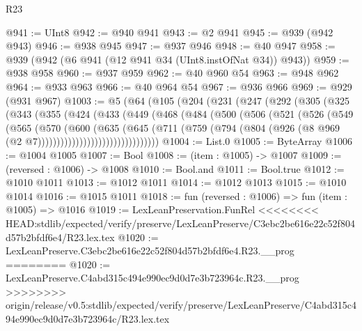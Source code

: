 \begin{lexlean}{R23}
\begin{coremodule}
{{{{{{{{{{{{{{{{{{{{{{{{{{{{{{{{{{{{{{{{{{{{{{{@941 := UInt8
@942 := @940 @941
@943 := @2 @941
@945 := @939 (@942 @943)
@946 := @938 @945
@947 := @937 @946
@948 := @40 @947
@958 := @939 (@942 (@6 @941 (@12 @941 @34 (UInt8.instOfNat @34)) @943))
@959 := @938 @958
@960 := @937 @959
@962 := @40 @960 @54
@963 := @948 @962
@964 := @933 @963
@966 := @40 @964 @54
@967 := @936 @966
@969 := @929 (@931 @967)
@1003 := @5
    (@64
      (@105
        (@204
          (@231
            (@247
              (@292
                (@305
                  (@325
                    (@343
                      (@355
                        (@424
                          (@433
                            (@449
                              (@468
                                (@484
                                  (@500
                                    (@506
                                      (@521
                                        (@526
                                          (@549
                                            (@565
                                              (@570
                                                (@600
                                                  (@635
                                                    (@645
                                                      (@711
                                                        (@759
                                                          (@794
                                                            (@804
                                                              (@926
                                                                (@8
                                                                  @969
                                                                  (@2
                                                                    @7))))))))))))))))))))))))))))))))
@1004 := List.{0}
@1005 := ByteArray
@1006 := @1004 @1005
@1007 := Bool
@1008 := (item : @1005) -> @1007
@1009 := (reversed : @1006) -> @1008
@1010 := Bool.and
@1011 := Bool.true
@1012 := @1010 @1011
@1013 := @1012 @1011
@1014 := @1012 @1013
@1015 := @1010 @1014
@1016 := @1015 @1011
@1018 := fun (reversed : @1006) => fun (item : @1005) => @1016
@1019 := LexLeanPreservation.FunRel
<<<<<<<< HEAD:stdlib/expected/verify/preserve/LexLeanPreserve/C3ebc2be616e22c52f804d57b2bfdf6e4/R23.lex.tex
@1020 := LexLeanPreserve.C3ebc2be616e22c52f804d57b2bfdf6e4.R23.__prog
========
@1020 := LexLeanPreserve.C4abd315c494e990ec9d0d7e3b723964c.R23.__prog
>>>>>>>> origin/release/v0.5:stdlib/expected/verify/preserve/LexLeanPreserve/C4abd315c494e990ec9d0d7e3b723964c/R23.lex.tex
}}}}}}}}}}}}}}}}}}}}}}}}}}}}}}}}}}}}}}}}}}}}}}}
\end{coremodule}
\end{lexlean}
